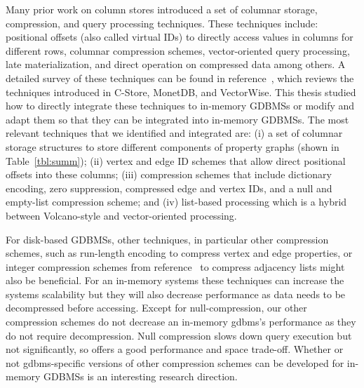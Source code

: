 Many prior work on column stores introduced a set of columnar storage, compression, and query processing techniques. These techniques include: positional offsets (also called virtual IDs) to directly access values in columns for different rows, columnar compression schemes, vector-oriented query processing, late materialization, and direct operation on compressed data among others. A detailed survey of these techniques can be found in reference~\cite{design-imp-book}, which reviews the techniques introduced in C-Store, MonetDB, and VectorWise.  This thesis studied how to directly integrate these techniques to in-memory GDBMSs or modify and adapt them so that they can be integrated into in-memory GDBMSs. The most relevant techniques that we identified and integrated are:  (i) a set of columnar storage structures to store different components of property graphs (shown in Table~\ref{tbl:summ}); (ii) vertex and edge ID schemes that allow direct positional offsets into these columns; (iii) compression schemes that include dictionary encoding, zero suppression, compressed edge and vertex IDs, and a null and empty-list compression scheme;  and (iv) list-based processing which is a hybrid between Volcano-style and vector-oriented processing. 

For disk-based GDBMSs, other techniques, in particular other compression schemes, such as run-length encoding to compress vertex and edge properties, or integer compression schemes from reference~\cite{lemire:integer} to compress adjacency lists might also be beneficial. For an in-memory systems these techniques can increase the systems scalability but they will also decrease performance as data needs to be decompressed before accessing. Except for null-compression, our other compression schemes do not decrease an in-memory \gls{gdbms}'s performance as they do not require decompression. Null compression slows down query execution but not significantly, so offers a good performance and space trade-off. Whether or not \gls{gdbms}-specific versions of other compression schemes can be developed for in-memory GDBMSs is an interesting research direction.


